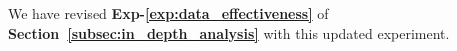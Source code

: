 We have revised \textbf{Exp-\ref{exp:data_effectiveness}} of \textbf{Section~\ref{subsec:in_depth_analysis}} with this updated experiment.



% 



